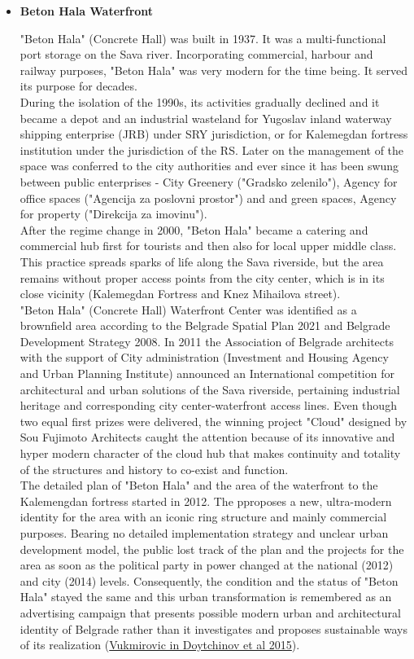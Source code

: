 \documentclass[11pt]{report}
\begin{document}
\begin{itemize}
\item \textbf{Beton Hala Waterfront}

"Beton Hala" (Concrete Hall) was built in 1937. It was a multi-functional port storage on the Sava river. Incorporating commercial, harbour and railway purposes, "Beton Hala" was very modern for the time being. It served its purpose for decades.
\\
During the isolation of the 1990s, its activities gradually declined and it became a depot and an industrial wasteland for Yugoslav inland waterway shipping enterprise (JRB) under SRY jurisdiction, or for Kalemegdan fortress institution under the jurisdiction of the RS.
Later on the management of the space was conferred to the city authorities and ever since it has been swung between public enterprises - City Greenery ("Gradsko zelenilo"), Agency for office spaces ("Agencija za poslovni prostor") and and green spaces, Agency for property ("Direkcija za imovinu").
\\
After the regime change in 2000, "Beton Hala" became a catering and commercial hub first for tourists and then also for local upper middle class. This practice spreads sparks of life along the Sava riverside, but the area remains without proper access points from the city center, which is in its close vicinity (Kalemegdan Fortress and Knez Mihailova street).
\\
"Beton Hala" (Concrete Hall) Waterfront Center was identified as a brownfield area according to the Belgrade Spatial Plan 2021 and Belgrade Development Strategy 2008. In 2011 the Association of Belgrade architects with the support of City administration (Investment and Housing Agency and Urban Planning Institute) announced an International competition for architectural and urban solutions of the Sava riverside, pertaining industrial heritage and corresponding city center-waterfront access lines.
Even though two equal first prizes were delivered, the winning project "Cloud"  designed  by  Sou  Fujimoto  Architects caught the attention because of its innovative and hyper modern character of the cloud hub that makes continuity and totality of the structures and history to co-exist and function.
\\
The detailed plan of "Beton Hala"  and the area of the waterfront to the Kalemengdan fortress started  in 2012. The pproposes a new, ultra-modern identity for the area with an iconic ring structure and mainly commercial purposes.
Bearing no detailed implementation strategy and unclear urban development model, the public lost track of the plan and the projects for the area as soon as the political party in power changed at the national (2012) and city (2014) levels.
Consequently, the condition and the status of "Beton Hala" stayed the same and this urban transformation is remembered as an advertising campaign that presents possible modern urban and architectural identity of Belgrade rather than it investigates and proposes sustainable ways of its realization (\href{ref}{Vukmirovic in Doytchinov et al 2015}).


\end{itemize}
\end{document}
